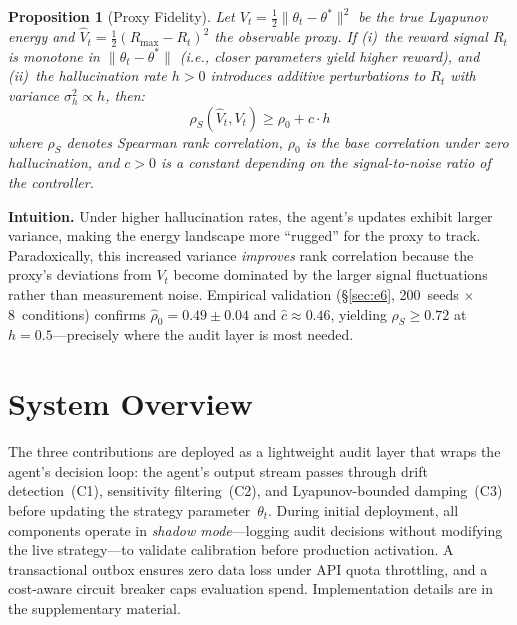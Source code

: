 \documentclass{article}
\newtheorem{proposition}{Proposition}
\begin{document}
\begin{proposition}[Proxy Fidelity]
\label{prop:proxy-fidelity}
Let $V_t = \frac{1}{2}\|\theta_t - \theta^*\|^2$ be the true Lyapunov
energy and $\hat{V}_t = \frac{1}{2}(R_{\max} - R_t)^2$ the observable
proxy. If (i)~the reward signal $R_t$ is monotone in
$\|\theta_t - \theta^*\|$ (i.e., closer parameters yield higher
reward), and (ii)~the hallucination rate $h > 0$ introduces additive
perturbations to $R_t$ with variance $\sigma_h^2 \propto h$, then:
\begin{equation}
  \rho_S(\hat{V}_t, V_t) \geq \rho_0 + c \cdot h
  \label{eq:proxy-bound}
\end{equation}
where $\rho_S$ denotes Spearman rank correlation, $\rho_0$ is the
base correlation under zero hallucination, and $c > 0$ is a constant
depending on the signal-to-noise ratio of the controller.
\end{proposition}

\textbf{Intuition.} Under higher hallucination rates, the agent's
updates exhibit larger variance, making the energy landscape more
``rugged'' for the proxy to track. Paradoxically, this increased
variance \emph{improves} rank correlation because the proxy's
deviations from $V_t$ become dominated by the larger signal
fluctuations rather than measurement noise.
Empirical validation (\S\ref{sec:e6}, 200~seeds $\times$ 8~conditions)
confirms $\hat{\rho}_0 = 0.49 \pm 0.04$ and $\hat{c} \approx 0.46$,
yielding $\rho_S \geq 0.72$ at $h{=}0.5$---precisely where the audit
layer is most needed.

\section{System Overview}
\label{sec:system}

The three contributions are deployed as a lightweight audit layer
that wraps the agent's decision loop: the agent's output stream
passes through drift detection~(C1), sensitivity filtering~(C2),
and Lyapunov-bounded damping~(C3) before updating the strategy
parameter~$\theta_t$. During initial deployment, all components
operate in \emph{shadow mode}---logging audit decisions without
modifying the live strategy---to validate calibration before
production activation.
A transactional outbox ensures zero data loss under API quota
throttling, and a cost-aware circuit breaker caps evaluation spend.
Implementation details are in the supplementary material.
\end{document}
